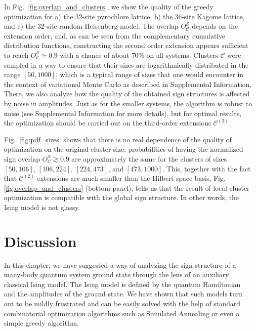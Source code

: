 In Fig.~\ref{fig:overlap_and_clusters}, we show the quality of the greedy optimization for a) the 32-site pyrochlore lattice, b) the 36-site Kagome lattice, and c) the 32-site random Heisenberg model. The overlap $O^\mathcal{S}_\mathcal{C}$ depends on the extension order, and, as can be seen from the complementary cumulative distribution functions, constructing the second order extension appears sufficient to reach $O^\mathcal{S}_\mathcal{C} \simeq 0.9$ with a chance of about 70\% on all systems. Clusters $\mathcal{C}$ were sampled in a way to ensure that their sizes are logarithmically distributed in the range $[50,1000]$, which is a typical range of sizes that one would encounter in the context of variational Monte Carlo as described in Supplemental Information. There, we also analyze how the quality of the obtained sign structures is affected by noise in amplitudes. Just as for the smaller systems, the algorithm is robust to noise (see Supplemental Information for more details), but for optimal results, the optimization should be carried out on the third-order extensions ${\mathcal C}^{(3)}$.

Fig.~\ref{fig:pdf_sizes} shows that there is no real dependence of the quality of optimization on the original cluster size: probabilities of having the normalized sign overlap $O^\mathcal{S}_\mathcal{C} \gtrsim 0.9$ are approximately the same for the clusters of sizes $[50, 106]$, $[106, 224]$, $[224, 473]$, and $[473, 1000]$. This, together with the fact that $\mathcal{C}^{(2)}$ extensions are much smaller than the Hilbert space basis, Fig. \ref{fig:overlap_and_clusters} (bottom panel), tells us that the result of local cluster optimization is compatible with the global sign structure. In other words, the Ising model is not glassy. 


\section{Discussion}

In this chapter, we have suggested a way of analyzing the sign structure of a many-body quantum system ground state through the lens of an auxiliary classical Ising model. The Ising model is defined by the quantum Hamiltonian and the amplitudes of the ground state. We have shown that such models turn out to be mildly frustrated and can be easily solved with the help of standard combinatorial optimization algorithms such as Simulated Annealing or even a simple greedy algorithm.

